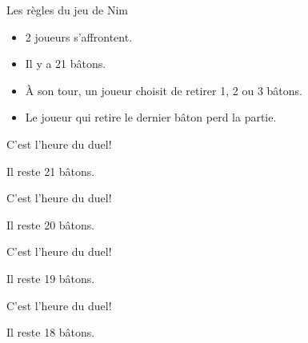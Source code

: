 \documentclass[serif]{beamer} %
\theoremstyle{definition}
\theoremstyle{remark}
\begin{document}
\begin{frame}{Les règles du jeu de Nim}
	\begin{itemize}
		\item 2 joueurs s'affrontent.
		\item Il y a 21 bâtons.
		\item À son tour, un joueur choisit de retirer 1, 2 ou 3 bâtons.
		\item Le joueur qui retire le dernier bâton perd la partie.
	\end{itemize}
\end{frame}

\begin{frame}{C'est l'heure du duel!}
\begin{center}
	
	Il reste 21 bâtons.
\end{center}
\end{frame}
\begin{frame}{C'est l'heure du duel!}
\begin{center}
	
	Il reste 20 bâtons.
\end{center}
\end{frame}
\begin{frame}{C'est l'heure du duel!}
\begin{center}
	
	Il reste 19 bâtons.
\end{center}
\end{frame}
\begin{frame}{C'est l'heure du duel!}
\begin{center}
	
	Il reste 18 bâtons.
\end{center}
\end{frame}
\end{document}
